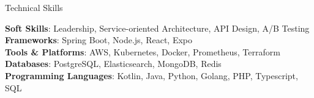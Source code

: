 \documentclass[
	10pt, %
]{resume} %
\begin{document}

\begin{rSection}{Technical Skills}

    \textbf{Soft Skills}: Leadership, Service-oriented Architecture, API Design, A/B Testing \\
    \textbf{Frameworks}: Spring Boot, Node.js, React, Expo \\
    \textbf{Tools \& Platforms}: AWS, Kubernetes, Docker, Prometheus, Terraform \\
    \textbf{Databases}: PostgreSQL, Elasticsearch, MongoDB, Redis \\
    \textbf{Programming Languages}: Kotlin, Java, Python, Golang, PHP, Typescript, SQL \\

\end{rSection}






\end{document}
